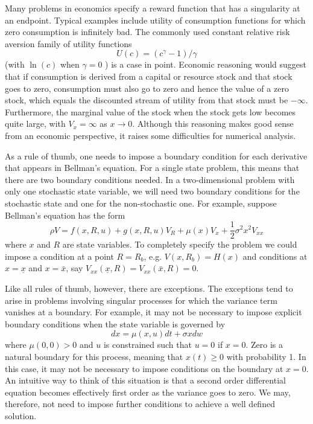 \documentclass[\topdir/lecture\_notes.tex]{subfiles}
\begin{document}
Many problems in economics specify a reward function that has a singularity at an endpoint. Typical examples include utility of consumption functions for which zero consumption is infinitely bad. The commonly used constant relative risk aversion family of utility functions
\begin{equation*}
U(c)=\left(c^{\gamma}-1\right) / \gamma
\end{equation*}
(with $\ln (c)$ when $\gamma=0$ ) is a case in point. Economic reasoning would suggest that if consumption is derived from a capital or resource stock and that stock goes to zero, consumption must also go to zero and hence the value of a zero stock, which equals the discounted stream of utility from that stock must be $-\infty$. Furthermore, the marginal value of the stock when the stock gets low becomes quite large, with $V_{x}=\infty$ as $x \rightarrow 0$. Although this reasoning makes good sense from an economic perspective, it raises some difficulties for numerical analysis.

As a rule of thumb, one needs to impose a boundary condition for each derivative that appears in Bellman's equation. For a single state problem, this means that there are two boundary conditions needed. In a two-dimensional problem with only one stochastic state variable, we will need two boundary conditions for the stochastic state and one for the non-stochastic one. For example, suppose Bellman's equation has the form
\begin{equation*}
\rho V=f(x, R, u)+g(x, R, u) V_{R}+\mu(x) V_{x}+\frac{1}{2} \sigma^{2} x^{2} V_{xx}
\end{equation*}
where $x$ and $R$ are state variables. To completely specify the problem we could impose a condition at a point $R=R_{b}$, e.g. $V\left(x, R_{b}\right)=H(x)$ and conditions at $x=\underline{x}$ and $x=\bar{x}$, say $V_{xx}(\underline{x}, R)=V_{xx}(\bar{x}, R)=0$.

Like all rules of thumb, however, there are exceptions. The exceptions tend to arise in problems involving singular processes for which the variance term vanishes at a boundary. For example, it may not be necessary to impose explicit boundary conditions when the state variable is governed by
\begin{equation*}
dx=\mu(x, u) dt+\sigma x dw
\end{equation*}
where $\mu(0,0)>0$ and $u$ is constrained such that $u=0$ if $x=0$. Zero is a natural boundary for this process, meaning that $x(t) \geq 0$ with probability 1. In this case, it may not be necessary to impose conditions on the boundary at $x=0$. An intuitive way to think of this situation is that a second order differential equation becomes effectively first order as the variance goes to zero. We may, therefore, not need to impose further conditions to achieve a well defined solution.
\end{document}
